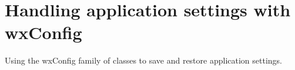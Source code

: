 \chapter{Handling application settings with wxConfig}\label{chapconfig}
%
%
\setfooter{\thepage}{}{}{}{}{\thepage}%

Using the wxConfig family of classes to save and restore application settings.

